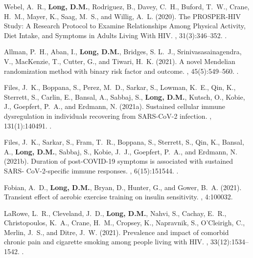 \begin{thebibliography}{}
Webel, A.~R., \textbf{Long, D.M.}, Rodriguez, B., Davey, C.~H., Buford, T.~W., Crane,
  H.~M., Mayer, K., Saag, M.~S., and Willig, A.~L. (2020).
\newblock The {PROSPER}-{HIV} {Study}: {A} {Research} {Protocol} to {Examine}
  {Relationships} {Among} {Physical} {Activity}, {Diet} {Intake}, and
  {Symptoms} in {Adults} {Living} {With} {HIV}.
,
  31(3):346--352.
.  


Allman, P.~H., Aban, I., \textbf{Long, D.M.}, Bridges, S. L.~J., Srinivasasainagendra,
  V., MacKenzie, T., Cutter, G., and Tiwari, H.~K. (2021).
\newblock A novel {Mendelian} randomization method with binary risk factor and
  outcome.
, 45(5):549--560.
.   


Files, J.~K., Boppana, S., Perez, M.~D., Sarkar, S., Lowman, K.~E., Qin, K.,
  Sterrett, S., Carlin, E., Bansal, A., Sabbaj, S., \textbf{Long, D.M.}, Kutsch, O.,
  Kobie, J., Goepfert, P.~A., and Erdmann, N. (2021a).
\newblock Sustained cellular immune dysregulation in individuals recovering
  from {SARS}-{CoV}-2 infection.
, 131(1):140491.
.  


Files, J.~K., Sarkar, S., Fram, T.~R., Boppana, S., Sterrett, S., Qin, K.,
  Bansal, A., \textbf{Long, D.M.}, Sabbaj, S., Kobie, J.~J., Goepfert, P.~A., and
  Erdmann, N. (2021b).
\newblock Duration of post-{COVID}-19 symptoms is associated with sustained
  {SARS}- {CoV}-2-specific immune responses.
, 6(15):151544.
.  


Fobian, A.~D., \textbf{Long, D.M.}, Bryan, D., Hunter, G., and Gower, B.~A. (2021).
\newblock Transient effect of aerobic exercise training on insulin sensitivity.
, 4:100032.

LaRowe, L.~R., Cleveland, J.~D., \textbf{Long, D.M.}, Nahvi, S., Cachay, E.~R.,
  Christopoulos, K.~A., Crane, H.~M., Cropsey, K., Napravnik, S., O'Cleirigh,
  C., Merlin, J.~S., and Ditre, J.~W. (2021).
\newblock Prevalence and impact of comorbid chronic pain and cigarette smoking
  among people living with {HIV}.
, 33(12):1534--1542.
.  



\end{thebibliography}
